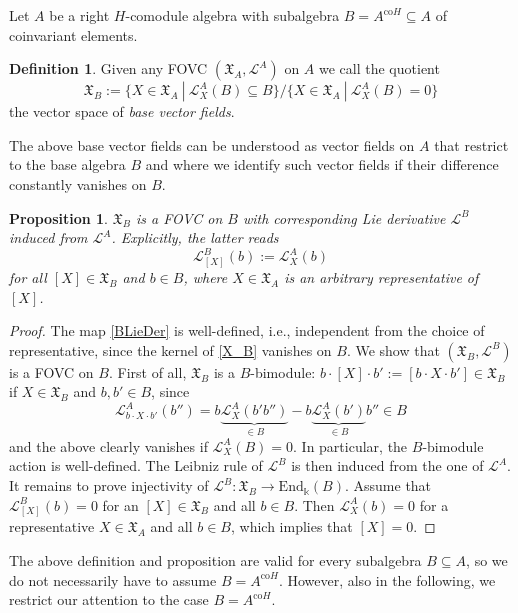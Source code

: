 \documentclass{article}
\newtheorem{proposition}[thm]{Proposition}
\theoremstyle{definition}
\newtheorem{definition}[thm]{Definition}
\begin{document}
Let $A$ be a right $H$-comodule algebra with subalgebra $B=A^{\mathrm{co}H}\subseteq A$ of coinvariant elements.
\begin{definition}%
	Given any FOVC $(\mathfrak{X}_A,\mathscr{L}^A)$ on $A$ we call the quotient
	\begin{equation}\label{X_B}
		\mathfrak{X}_B:=\{X\in\mathfrak{X}_A~|~\mathscr{L}^A_X(B)\subseteq B\}\bigg/\{X\in\mathfrak{X}_A~|~\mathscr{L}^A_X(B)=0\}
	\end{equation}
	the vector space of \textit{base vector fields}.
\end{definition}
The above base vector fields can be understood as vector fields on $A$ that restrict to the base algebra $B$ and where we identify such vector fields if their difference constantly vanishes on $B$.
\begin{proposition}\label{prop:base}
	$\mathfrak{X}_B$ is a FOVC on $B$ with corresponding Lie derivative $\mathscr{L}^B$ induced from $\mathscr{L}^A$. Explicitly, the latter reads
	\begin{equation}\label{BLieDer}
		\mathscr{L}^B_{[X]}(b):=\mathscr{L}^A_X(b)
	\end{equation}
	for all $[X]\in\mathfrak{X}_B$ and $b\in B$, where $X\in\mathfrak{X}_A$ is an arbitrary representative of $[X]$.
\end{proposition}
\begin{proof}
	The map \eqref{BLieDer} is well-defined, i.e., independent from the choice of representative, since the kernel of \eqref{X_B} vanishes on $B$. We show that $(\mathfrak{X}_B,\mathscr{L}^B)$ is a FOVC on $B$. First of all, $\mathfrak{X}_B$ is a $B$-bimodule: $b\cdot [X]\cdot b':=[b\cdot X\cdot b']\in\mathfrak{X}_B$ if $X\in\mathfrak{X}_B$ and $b,b'\in B$, since 
	$$
	\mathscr{L}^A_{b\cdot X\cdot b'}(b'')
	=b\underbrace{\mathscr{L}^A_X(b'b'')}_{\in B}-b\underbrace{\mathscr{L}^A_X(b')}_{\in B}b''\in B
	$$
	and the above clearly vanishes if $\mathscr{L}^A_X(B)=0$. In particular, the $B$-bimodule action is well-defined. The Leibniz rule of $\mathscr{L}^B$ is then induced from the one of $\mathscr{L}^A$. It remains to prove injectivity of $\mathscr{L}^B\colon\mathfrak{X}_B\to\mathrm{End}_\Bbbk(B)$. Assume that $\mathscr{L}^B_{[X]}(b)=0$ for an $[X]\in\mathfrak{X}_B$ and all $b\in B$. Then $\mathscr{L}^A_X(b)=0$ for a representative $X\in\mathfrak{X}_A$ and all $b\in B$, which implies that $[X]=0$.
\end{proof}


The above definition and proposition are valid for every subalgebra $B\subseteq A$, so we do not necessarily have to assume $B=A^{\mathrm{co}H}$. However, also in the following, we restrict our attention to the case $B=A^{\mathrm{co}H}$.
\end{document}
